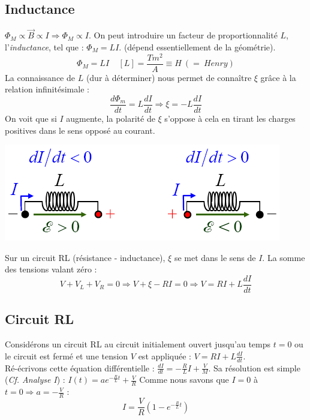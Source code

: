 \documentclass	[11pt, a4paper, openany]{book}
\begin{document}
\subsection{Inductance}
$\Phi_M \propto \vec{B} \propto I \Rightarrow \Phi_M \propto I$. On peut introduire un facteur de proportionnalité $L$, l'\textit{inductance}, tel que : $\Phi_M = LI$. (dépend essentiellement de la géométrie).
\begin{equation}
	\Phi_M = LI\ \ \ \ \ [L] = \frac{Tm^2}{A} \equiv H\ (=\ Henry)
\end{equation}
La connaissance de $L$ (dur à déterminer) nous permet de connaître $\xi$ grâce à la relation infinitésimale :
\begin{equation}
	\frac{d\Phi_m}{dt} = L \frac{dI}{dt} \Rightarrow \xi = -L\frac{dI}{dt}
\end{equation}
On voit que si $I$ augmente, la polarité de $\xi$ s'oppose à cela en tirant les charges positives dans le sens opposé au courant.
\begin{center}
	\includegraphics[scale=0.50]{em/image22.png}\\
\end{center}
Sur un circuit RL (résistance - inductance), $\xi$ se met dans le sens de $I$. La somme des tensions valant zéro : 
\begin{equation}
	V + V_L + V_R = 0 \Rightarrow V + \xi - RI = 0 \Rightarrow V = RI + L\frac{dI}{dt}
\end{equation}

\subsection{Circuit RL}
Considérons un circuit RL au circuit initialement ouvert jusqu'au temps $t = 0$ ou le circuit est fermé et une tension $V$ est appliquée : $V = RI + L\frac{dI}{dt}$.\\
Ré-écrivons cette équation différentielle : $\frac{dI}{dt} = -\frac{R}{L}I + \frac{V}{M}$. Sa résolution est simple (\textit{Cf. Analyse I}) :
$I(t) = ae^{-\frac{R}{L}t} + \frac{V}{R}$
Comme nous savons que $I = 0$ à $t = 0 \Rightarrow a= - \frac{V}{R}$ :
\begin{equation}
	I = \frac{V}{R}\left(1-e^{-\frac{R}{L}t}\right)
\end{equation}
\end{document}
